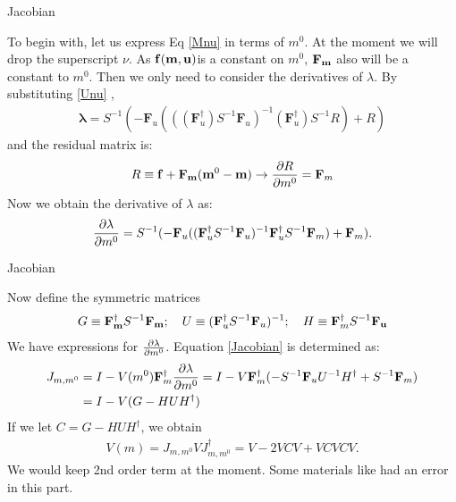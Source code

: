 \documentclass[
	xcolor=dvipsnames,
	aspectratio=169,	
	10pt, 
	]{beamer}
\begin{document}
\begin{frame}{Jacobian}
	\begin{block}{}
		To begin with, let us express Eq \eqref{Mnu} in terms of $m^0$. At the moment we will drop the superscript $\nu$. As $\mathbf{f}(\mathbf{m},\mathbf{u})$is a constant on $m^0$, $\mathbf{F}_{\mathbf{m}}$ also will be a constant to $m^0$. Then we only need to consider the derivatives of $\lambda$. By substituting \eqref{Unu} ,
		\begin{align}
	\mathbf\lambda = S^{-1}(-\mathbf F_u(((\mathbf{F}_u^\dagger) S^{-1}\mathbf F_u)^{-1}(\mathbf{F}_u^\dagger) S^{-1}R) + R)
		\end{align}
		and the residual matrix is:
		\begin{align}
			R\equiv \mathbf f + \mathbf{F}_\mathbf{m}(\mathbf{m}^0-\mathbf{m})\to \frac{\partial R}{\partial m^0}= \mathbf{F}_m
		\end{align} 
		Now we obtain the derivative of $\lambda$ as:
		\begin{align}
			\frac{\partial \lambda}{\partial m^0}= S^{-1}(-\mathbf F_u((\mathbf{F}_u^\dagger S^{-1}\mathbf F_u)^{-1}\mathbf{F}_u^\dagger S^{-1}\mathbf{F}_m) + \mathbf{F}_m).
		\end{align}
	\end{block}
\end{frame}
\begin{frame}{Jacobian}
	\begin{block}{}
		Now define the symmetric matrices
		\begin{align}
			G\equiv \mathbf{F_m^\dagger} S^{-1}\mathbf{F_m};\quad U\equiv (\mathbf{F}_u^\dagger S^{-1}\mathbf F_u)^{-1};\quad H\equiv \mathbf{F}_m^\dagger S^{-1}\mathbf{F_u}
		\end{align}
		We have expressions for $\frac{\partial \lambda}{\partial m^0}$. Equation \eqref{Jacobian} is determined as:
		\begin{align}
			J_{m,m^0}&=I - V(m^0)\mathbf{F}_m^\dagger\frac{\partial \lambda}{\partial m^0}=I - V\mathbf{F}^\dagger_m(-S^{-1}\mathbf{F}_u U^{-1}H^\dagger+S^{-1}\mathbf{F}_m)\nonumber\\
			&=I-V(G-HUH^\dagger)
		\end{align}
		If we let $C =G-HUH^\dagger$, we obtain
		\begin{align}
			V(m) = J_{m,m^0} VJ_{m,m^0}^\dagger =V -2 VCV  +VCVCV.\label{Vm}
		\end{align}
		We would keep 2nd order term at the moment. Some materials like \cite{Prob} had an error in this part.
	\end{block}
\end{frame}
\end{document}
